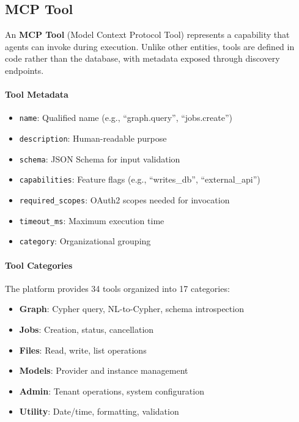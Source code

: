 \subsection{MCP Tool}

An \textbf{MCP Tool} (Model Context Protocol Tool) represents a capability that agents can invoke during execution. Unlike other entities, tools are defined in code rather than the database, with metadata exposed through discovery endpoints.

\paragraph{Tool Metadata}
\begin{itemize}
    \item \texttt{name}: Qualified name (e.g., ``graph.query'', ``jobs.create'')
    \item \texttt{description}: Human-readable purpose
    \item \texttt{schema}: JSON Schema for input validation
    \item \texttt{capabilities}: Feature flags (e.g., ``writes\_db'', ``external\_api'')
    \item \texttt{required\_scopes}: OAuth2 scopes needed for invocation
    \item \texttt{timeout\_ms}: Maximum execution time
    \item \texttt{category}: Organizational grouping
\end{itemize}

\paragraph{Tool Categories}
The platform provides 34 tools organized into 17 categories:
\begin{itemize}
    \item \textbf{Graph}: Cypher query, NL-to-Cypher, schema introspection
    \item \textbf{Jobs}: Creation, status, cancellation
    \item \textbf{Files}: Read, write, list operations
    \item \textbf{Models}: Provider and instance management
    \item \textbf{Admin}: Tenant operations, system configuration
    \item \textbf{Utility}: Date/time, formatting, validation
\end{itemize}

